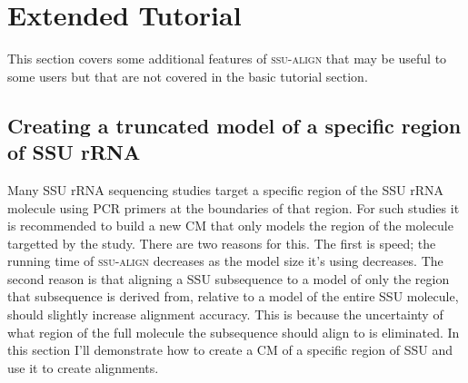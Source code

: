 \section{Extended Tutorial}

This section covers some additional features of \textsc{ssu-align}
that may be useful to some users but that are not covered in the basic
tutorial section. 

\begin{comment}
\subsection{Files used in this tutorial}

The subdirectory \prog{/tutorial-extended} in the \software{ssu-align}
distribution contains the files used in the tutorial:

  \begin{sreitems}{}
  \item[\prog{ssu5-0p1.cm}] A covariance model (CM) file that
    defines five SSU rRNA CMs: an archael model, a bacterial model, a
    choloroplast wmodel, a eukaryotic model and a metazoan
    mitrochondria model. These are the five default models used by
    textsc{SSUalign}.
  \item[\prog{rocks.fa}] SSU rRNA sequences from the an environmental
    survey sequencing project of microbes living in the pore space of
    rocks in the Rocky Mountains by J.J. Walker and Norm Pace
    \cite{Walker07}. 
  \end{sreitems}

Create a new directory that you can work in, and copy all the files in
\prog{tutorial-extended} there. I'll assume for the following examples
that you've installed the \software{ssu-align} programs in your path;
if not, you'll need to give a complete path name to the programs
(e.g. something like
\newline
\prog{/usr/people/nawrocki/ssualign/src/ssu-align} 
instead of just \prog{ssu-align}).
\end{comment}

\subsection{Creating a truncated model of a specific region of SSU rRNA}

Many SSU rRNA sequencing studies target a specific region of the SSU
rRNA molecule using PCR primers at the boundaries of that region. For
such studies it is recommended to build a new CM that only models the
region of the molecule targetted by the study. There are two reasons
for this. The first is speed; the running time of \textsc{ssu-align}
decreases as the model size it's using decreases. The second reason is
that aligning a SSU subsequence to a model of only the region that
subsequence is derived from, relative to a model of the entire SSU
molecule, should slightly increase alignment accuracy. This is because
the uncertainty of what region of the full molecule the subsequence
should align to is eliminated. In this section I'll demonstrate how to
create a CM of a specific region of SSU and use it to create
alignments.

